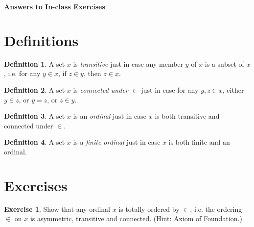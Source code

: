 \documentclass[11pt]{article}
\theoremstyle{definition}
\newtheorem{defn}{Definition}
\newtheorem{exer}{Exercise}
\begin{document}




\begin{center}
{\LARGE \bf Answers to In-class Exercises}
\end{center}

\smallskip

\section{Definitions}

\begin{defn}
A set $x$ is \textit{transitive} just in case any member $y$ of $x$ is a subset of $x$, i.e. for any $y \in x$, if $z \in y$, then $z \in x$.
\end{defn}

\begin{defn}
A set $x$ is \textit{connected under $\in$} just in case for any $y, z \in x$, either $y \in z$, or $y = z$, or $z \in y$.
\end{defn}

\begin{defn}
A set $x$ is an \textit{ordinal} just in case $x$ is both transitive and connected under $\in$.
\end{defn}

\begin{defn}
A set $x$ is a \textit{finite ordinal} just in case $x$ is both finite and an ordinal.
\end{defn}

\section{Exercises}

\begin{exer}
Show that any ordinal $x$ is totally ordered by $\in$, i.e. the ordering $\in$ on $x$ is asymmetric, transitive and connected. (Hint: Axiom of Foundation.)
\end{exer}
\end{document}
